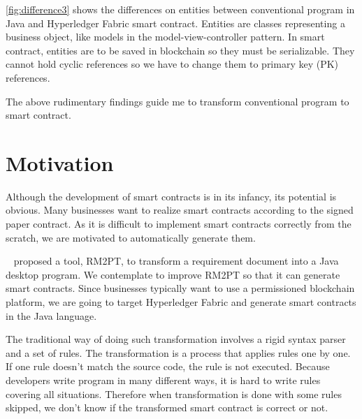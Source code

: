 \autoref{fig:difference3} shows the differences on entities between conventional program in Java and Hyperledger Fabric smart contract.
Entities are classes representing a business object, like models in the model-view-controller pattern.
In smart contract, entities are to be saved in blockchain so they must be serializable. They cannot hold cyclic references so we have to change them to primary key (PK) references.

The above rudimentary findings guide me to transform conventional program to smart contract.

\section{Motivation}


Although the development of smart contracts is in its infancy, its potential is obvious. Many businesses want to realize smart contracts according to the signed paper contract.
As it is difficult to implement smart contracts correctly from the scratch,
we are motivated to automatically generate them.

~\cite{yang2019automated} proposed a tool, RM2PT, to transform a requirement document into a Java desktop program.
We contemplate to improve RM2PT so that it can generate smart contracts.
Since businesses typically want to use a permissioned blockchain platform, we are going to target Hyperledger Fabric and generate smart contracts in the Java language.


The traditional way of doing such transformation involves a rigid syntax parser and a set of rules.
The transformation is a process that applies rules one by one. If one rule doesn't match the source code, the rule is not executed.
Because developers write program in many different ways, it is hard to write rules covering all situations.
Therefore when transformation is done with some rules skipped, we don't know if the transformed smart contract is correct or not.

